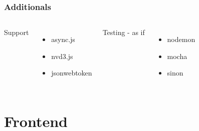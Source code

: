\documentclass[10pt, compress]{beamer}
\begin{document}
\begin{frame}[fragile]

  \frametitle{Additionals}

    \begin{columns}[onlytextwidth]
    \Large
      Support
      \begin{itemize}
        \item async.js
        \item nvd3.js
        \item jsonwebtoken
      \end{itemize}

      Testing - as if 
      \begin{itemize}
        \item nodemon
        \item mocha
        \item sinon
      \end{itemize}
  \end{columns}

\end{frame}

\section{Frontend}
\end{document}
